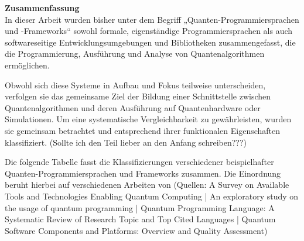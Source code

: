 \textbf{Zusammenfassung} \\
In dieser Arbeit wurden bisher unter dem Begriff „Quanten-Programmiersprachen und -Frameworks“ sowohl formale, eigenständige Programmiersprachen als auch softwareseitige Entwicklungsumgebungen und Bibliotheken zusammengefasst, die die Programmierung, Ausführung und Analyse von Quantenalgorithmen ermöglichen.

Obwohl sich diese Systeme in Aufbau und Fokus teilweise unterscheiden, verfolgen sie das gemeinsame Ziel der Bildung einer Schnittstelle zwischen Quantenalgorithmen und deren Ausführung auf Quantenhardware oder Simulationen. Um eine systematische Vergleichbarkeit zu gewährleisten, wurden sie gemeinsam betrachtet und entsprechend ihrer funktionalen Eigenschaften klassifiziert. (Sollte ich den Teil lieber an den Anfang schreiben???)

Die folgende Tabelle fasst die Klassifizierungen verschiedener beispielhafter Quanten-Programmiersprachen und Frameworks zusammen. Die Einordnung beruht hierbei auf verschiedenen Arbeiten von (Quellen: A Survey on Available Tools and Technologies Enabling Quantum Computing | An exploratory study on the usage of quantum programming | Quantum Programming Language: A Systematic Review of Research Topic and Top Cited Languages | Quantum Software Components and Platforms: Overview and Quality Assessment)

